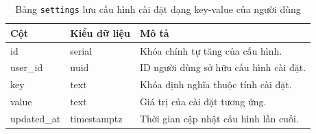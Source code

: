\begin{table}[H]
\centering
\begin{tabular}{|l|l|p{6cm}|}
\hline
\textbf{Cột} & \textbf{Kiểu dữ liệu} & \textbf{Mô tả} \\ \hline
id & serial & Khóa chính tự tăng của cấu hình. \\ \hline
user\_id & uuid & ID người dùng sở hữu cấu hình cài đặt. \\ \hline
key & text & Khóa định nghĩa thuộc tính cài đặt. \\ \hline
value & text & Giá trị của cài đặt tương ứng. \\ \hline
updated\_at & timestamptz & Thời gian cập nhật cấu hình lần cuối. \\ \hline
\end{tabular}
\caption{Bảng \texttt{settings} lưu cấu hình cài đặt dạng key-value của người dùng}
\end{table}
